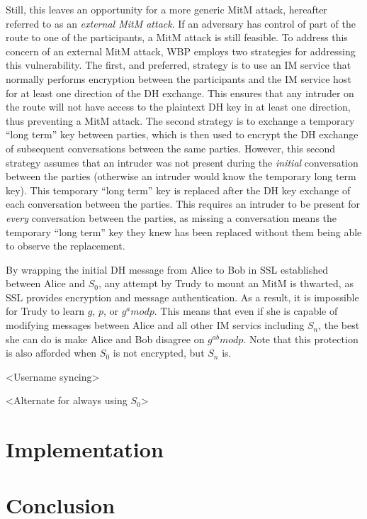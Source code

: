 \documentclass[twoside]{article}
\begin{document}
\begin{multicols}{2}
Still, this leaves an opportunity for a more generic MitM attack, hereafter referred to as an \emph{external MitM attack}.  If an adversary has control of part of the route to one of the participants, a MitM attack is still feasible.  To address this concern of an external MitM attack, WBP employs two strategies for addressing this vulnerability.  The first, and preferred, strategy is to use an IM service that normally performs encryption between the participants and the IM service host for at least one direction of the DH exchange.  This ensures that any intruder on the route will not have access to the plaintext DH key in at least one direction, thus preventing a MitM attack.  The second strategy is to exchange a temporary ``long term'' key between parties, which is then used to encrypt the DH exchange of subsequent conversations between the same parties.  However, this second strategy assumes that an intruder was not present during the \emph{initial} conversation between the parties (otherwise an intruder would know the temporary long term key).  This temporary ``long term'' key is replaced after the DH key exchange of each conversation between the parties.  This requires an intruder to be  present for \emph{every} conversation between the parties, as missing a conversation means the temporary ``long term'' key they knew has been replaced without them being able to observe the replacement.

By wrapping the initial DH message from Alice to Bob in SSL established between Alice and $S_0$, any attempt by Trudy to mount an MitM is thwarted, as SSL provides encryption and message authentication.  As a result, it is impossible for Trudy to learn $g$, $p$, or $g^a mod p$.  This means that even if she is capable of modifying messages between Alice and all other IM servics including $S_n$, the best she can do is make Alice and Bob disagree on $g^{ab} mod p$.  Note that this protection is also afforded when $S_0$ is not encrypted, but $S_n$ is.

<Username syncing>

<Alternate for always using $S_0$>



\section{Implementation}

\section{Conclusion}


\end{multicols}
\end{document}
